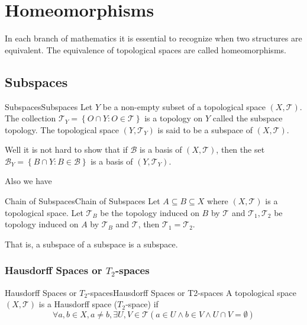 \documentclass[../main.tex]{subfiles}
\begin{document}
\chapter{Homeomorphisms}

In each branch of mathematics it is essential to recognize when two structures are equivalent. The equivalence of topological spaces are called homeomorphisms.

\section{Subspaces}
\begin{definition}{Subspaces}{Subspaces}
Let $Y$ be a non-empty subset of a topological space $(X,\mathcal{T})$. The collection $\mathcal{T}_Y = \left\{ O\cap Y: O\in \mathcal{T} \right\}$ is a topology on $Y$ called the subspace topology. The topological space $(Y,\mathcal{T}_Y)$ is said to be a subspace of $(X,\mathcal{T})$.
\end{definition}

Well it is not hard to show that if $\mathcal{B}$ is a basis of $(X,\mathcal{T})$, then the set $\mathcal{B}_Y = \left\{ B\cap Y: B\in \mathcal{B} \right\}$ is a basis of $(Y,\mathcal{T}_Y)$.

Also we have
\begin{proposition}{Chain of Subspaces}{Chain of Subspaces}
Let $A \subseteq B \subseteq X$ where $(X,\mathcal{T})$ is a topological space. Let $\mathcal{T}_B$ be the topology induced on $B$ by $\mathcal{T}$ and $\mathcal{T}_1,\mathcal{T}_2$ be topology induced on $A$ by $\mathcal{T}_B$ and $\mathcal{T}$, then $\mathcal{T}_1=\mathcal{T}_2$.

That is, a subspace of a subspace is a subspace.
\end{proposition}

\subsection{Hausdorff Spaces or $T_2$-spaces}
\begin{definition}{Hausdorff Spaces or $T_2$-spaces}{Hausdorff Spaces or T2-spaces}
A topological space $(X,\mathcal{T})$ is a Hausdorff space ($T_2$-space) if
\begin{equation*}
\forall a,b\in X, a\neq b,\exists U,V\in \mathcal{T} (a\in U \land b\in V \land U\cap V = \emptyset )
\end{equation*}
\end{definition}
\end{document}
